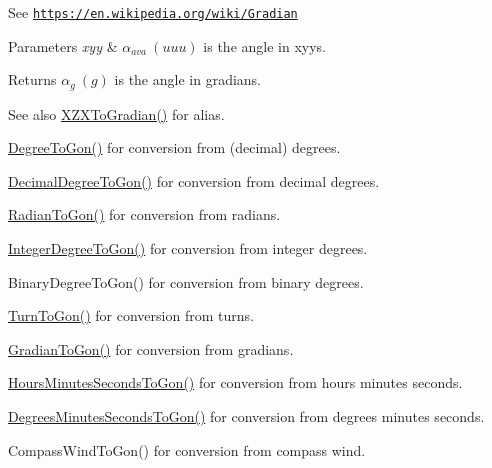 See \href{https://en.wikipedia.org/wiki/Gradian}{\tt https\+://en.\+wikipedia.\+org/wiki/\+Gradian} 
\begin{DoxyParams}{Parameters}
{\em xyy} & $\alpha_{ava}\ (uuu)$ is the angle in xyys. \\
\hline
\end{DoxyParams}
\begin{DoxyReturn}{Returns}
$\alpha_{g}\ (g)$ is the angle in gradians. 
\end{DoxyReturn}
\begin{DoxySeeAlso}{See also}
\mbox{\hyperlink{group___e_g_x_math-_angle_conversions-_x_z_x_ga91288ab3da9655e8ac1e3db44f9620a4}{X\+Z\+X\+To\+Gradian()}} for alias. 

\mbox{\hyperlink{group___e_g_x_math-_angle_conversions-_degree_ga87c3fab0867021e5d2501197b4db6194}{Degree\+To\+Gon()}} for conversion from (decimal) degrees. 

\mbox{\hyperlink{group___e_g_x_math-_angle_conversions-_decimal_degree_gaeb333a1ad0aeb913c025fbd1be85fcb3}{Decimal\+Degree\+To\+Gon()}} for conversion from decimal degrees. 

\mbox{\hyperlink{group___e_g_x_math-_angle_conversions-_radian_ga36912e5a810b64c271c4dafc17f4ca45}{Radian\+To\+Gon()}} for conversion from radians. 

\mbox{\hyperlink{group___e_g_x_math-_angle_conversions-_integer_degree_ga6e5be425c37ad27319f09329156c64bb}{Integer\+Degree\+To\+Gon()}} for conversion from integer degrees. 

Binary\+Degree\+To\+Gon() for conversion from binary degrees. 

\mbox{\hyperlink{group___e_g_x_math-_angle_conversions-_turn_gad81dd0bb1660ef24e28fa15b2403dec7}{Turn\+To\+Gon()}} for conversion from turns. 

\mbox{\hyperlink{group___e_g_x_math-_angle_conversions-_gradian_gaff399262b6c8455e450e0a9dc8eb2ad1}{Gradian\+To\+Gon()}} for conversion from gradians. 

\mbox{\hyperlink{group___e_g_x_math-_angle_conversions-_hours_minutes_seconds_ga356f1e89c3ea35a9d46967644d4ddfd3}{Hours\+Minutes\+Seconds\+To\+Gon()}} for conversion from hours minutes seconds. 

\mbox{\hyperlink{group___e_g_x_math-_angle_conversions-_degrees_minutes_seconds_ga90b481c224ad083726ffe0fd35f4dbfc}{Degrees\+Minutes\+Seconds\+To\+Gon()}} for conversion from degrees minutes seconds. 

Compass\+Wind\+To\+Gon() for conversion from compass wind. 
\end{DoxySeeAlso}
\mbox{\label{group___e_g_x_math-_angle_conversions-_x_z_x_ga91288ab3da9655e8ac1e3db44f9620a4}} 
